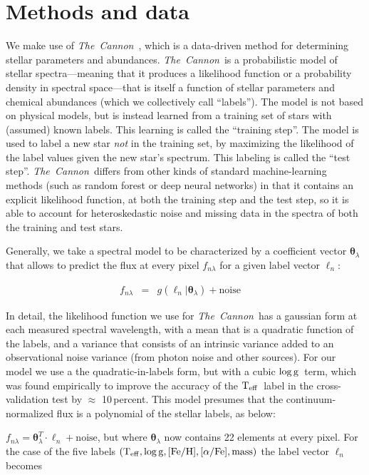 \documentclass[12pt, preprint]{aastex}
\newcommand{\project}[1]{\textsl{#1}}
\newcommand{\tc}{\project{The~Cannon}}
\newcommand{\teff}{\mbox{$\rm T_{eff}$}}
\newcommand{\feh}{\mbox{$\rm [Fe/H]$}}
\newcommand{\alphafe}{\mbox{$\rm [\alpha/Fe]$}}
\newcommand{\logg}{\mbox{$\rm \log g$}}
\newcommand{\set}[1]{\bm{#1}}
\newcommand{\starlabel}{\ell}
\newcommand{\starlabelvec}{\set{\starlabel}}
\begin{document}
\section{Methods and data}

We make use of \tc\ \citep{Ness2015}, which is a data-driven method for
determining stellar parameters and abundances.
\tc\ is a probabilistic model of stellar spectra---meaning that it
produces a likelihood function or a probability density in spectral
space---that is itself a function of stellar parameters and chemical
abundances (which we collectively call ``labels'').
The model is not based on physical models, but is instead learned
from a training set of stars with (assumed) known labels.
This learning is called the ``training step''.
The model is used to label a new star \emph{not} in the training set,
by maximizing the likelihood of the label values given the new star's
spectrum.
This labeling is called the ``test step''.
\tc\ differs from other kinds of standard machine-learning methods
(such as random forest or deep neural networks) in that it contains an
explicit likelihood function, at both the training step and the test
step, so it is able to account for heteroskedastic noise and missing
data in the spectra of both the training and test stars.

Generally, we take a spectral model to be characterized by a coefficient vector $\set{\theta}_\lambda$
that allows to predict the flux at every pixel $f_{n\lambda}$ for a given label vector $\starlabelvec_n$:


\begin{eqnarray}
f_{n\lambda} &=&
g(\starlabelvec_n |  \set{\theta}_\lambda) + \mbox{noise}
\label{eq:specmodel}\quad 
\end{eqnarray}

In detail, the likelihood function we use for \tc\ has a
gaussian form at each measured spectral wavelength, with a mean that
is a quadratic function of the labels, and a variance that consists of
an intrinsic variance added to an observational noise variance (from
photon noise and other sources). For our model we use a the quadratic-in-labels form, but with a cubic \logg\ term, which was found empirically to improve the accuracy of the \teff\ label in the cross-validation test by $\approx$ 10\,percent.  This model presumes that the continuum-normalized flux is a polynomial of the stellar labels, as below: 

$f_{n\lambda} =
\set{\theta}_\lambda^T \cdot \starlabelvec_n + \mbox{noise}$, 
but where $\set{\theta}_\lambda$ now contains 22 elements at every pixel. For the case of the five labels $(\teff , \logg , \feh, \alphafe, \mbox{mass})$ the label vector $\starlabelvec_n$
becomes  
\end{document}

